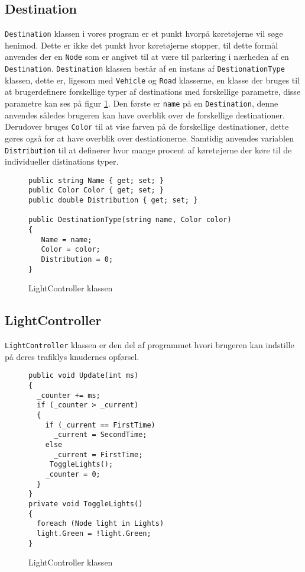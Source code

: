 \subsection*{Destination}
\texttt{Destination} klassen i vores program er et punkt hvorpå køretøjerne vil søge henimod. Dette er ikke det punkt hvor køretøjerne stopper, til dette formål anvendes der en \texttt{Node} som er angivet til at være til parkering i nærheden af en \texttt{Destination}. \texttt{Destination} klassen består af en instans af \texttt{DestionationType} klassen, dette er, ligesom med \texttt{Vehicle} og \texttt{Road} klasserne, en klasse der bruges til at brugerdefinere forskellige typer af destinations med forskellige parametre, disse parametre kan ses på figur \ref{DestinationTypes}. Den første er \texttt{name} på en \texttt{Destination}, denne anvendes således brugeren kan have overblik over de forskellige destinationer. Derudover bruges \texttt{Color} til at vise farven på de forskellige destinationer, dette gøres også for at have overblik over destiationerne. Samtidig anvendes variablen \texttt{Distribution} til at definerer hvor mange procent af køretøjerne der køre til de individueller distinations typer.

\begin{figure}[H]
\begin{lstlisting}
public string Name { get; set; }
public Color Color { get; set; }
public double Distribution { get; set; }

public DestinationType(string name, Color color)
{
   Name = name;
   Color = color;
   Distribution = 0;
}
\end{lstlisting}
\caption{LightController klassen}\label{DestinationTypes}
\end{figure}

\subsection*{LightController}
\texttt{LightController} klassen er den del af programmet hvori brugeren kan indstille på deres trafiklys knudernes opførsel.

\begin{figure}[H]
\begin{lstlisting}
public void Update(int ms)
{
  _counter += ms;
  if (_counter > _current)
  {
    if (_current == FirstTime)
      _current = SecondTime;
    else
      _current = FirstTime;
     ToggleLights();
    _counter = 0;
  }
}
private void ToggleLights()
{
  foreach (Node light in Lights)
  light.Green = !light.Green;
}
\end{lstlisting}
\caption{LightController klassen}\label{LightControllerKlassen}
\end{figure}

